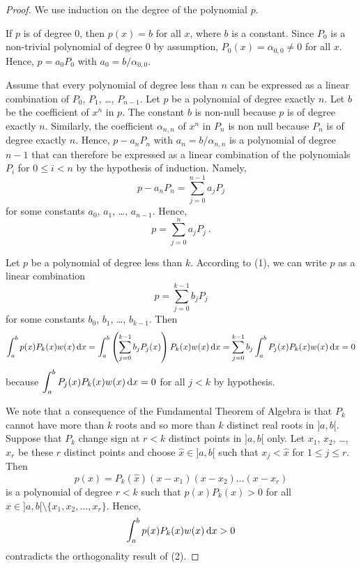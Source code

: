 \begin{proof}
 We use induction on the degree of the polynomial $p$.

If $p$ is of degree $0$, then $p(x) = b$ for all $x$, where
$b$ is a constant.  Since $P_0$ is a non-trivial polynomial of
degree $0$ by assumption, $P_0(x) = \alpha_{0,0} \neq 0$ for all $x$.
Hence, $p = a_0 P_0$ with $a_0 = b/\alpha_{0,0}$.

Assume that every polynomial of degree less than $n$ can be expressed
as a linear combination of $P_0$, $P_1$, \ldots, $P_{n-1}$.  Let $p$
be a polynomial of degree exactly $n$.  Let $b$ be the coefficient
of $x^n$ in $p$.  The constant $b$ is non-null because $p$ is of
degree exactly $n$.  Similarly, the coefficient $\alpha_{n,n}$ of $x^n$ in
$P_n$ is non null because $P_n$ is of degree exactly $n$.  Hence,
$p - a_n P_n$ with $a_n = b/\alpha_{n,n}$ is a polynomial of degree $n-1$ that
can therefore be expressed as a linear combination of the polynomials
$P_i$ for $0\leq i < n$ by the hypothesis of induction.  Namely,
\[
p - a_n P_n = \sum_{j=0}^{n-1} a_j P_j
\]
for some constants $a_0$, $a_1$, \ldots, $a_{n-1}$.  Hence,
\[
p= \sum_{j=0}^n a_j P_j \ .
\]

 Let $p$ be a polynomial of degree
less than $k$.  According to (1), we can write $p$ as a linear combination
\[
p = \sum_{j=0}^{k-1}b_j P_j
\]
for some constants $b_0$, $b_1$, \ldots, $b_{k-1}$.  Then
\[
\int_a^b p(x)P_k(x) w(x)\,\mathrm{d}x
= \int_a^b \left(\sum_{j=0}^{k-1}b_j P_j(x)\right) P_k(x) w(x)\,\mathrm{d}x
= \sum_{j=0}^{k-1} b_j  \int_a^b P_j(x) P_k(x) w(x)\,\mathrm{d}x = 0
\]
because $\displaystyle \int_a^b P_j(x) P_k(x) w(x)\,\mathrm{d}x =0$ for
all $j<k$ by hypothesis.

 We note that a consequence of the
Fundamental Theorem of Algebra is that $P_k$ cannot have more than
$k$ roots and so more than $k$ distinct real roots in $]a,b[$.
Suppose that $P_k$ change sign at $r < k$ distinct points in $]a,b[$
only.  Let $x_1$, $x_2$, \ldots, $x_r$ be these $r$ distinct points
and choose $\hat{x} \in ]a,b[$ such that $x_j< \hat{x}$ for
$1\leq j \leq r$.   Then
\[
p(x) = P_k(\hat{x})(x-x_1)(x-x_2)\ldots(x-x_r)
\]
is a polynomial of degree $r<k$ such that $p(x)P_k(x)>0$ for all
$x\in]a,b[\setminus \{x_1,x_2,\ldots,x_r\}$.  Hence,
\[
\int_a^b p(x) P_k(x) w(x)\,\mathrm{d}x > 0
\]
contradicts the orthogonality result of (2).


\end{proof}
